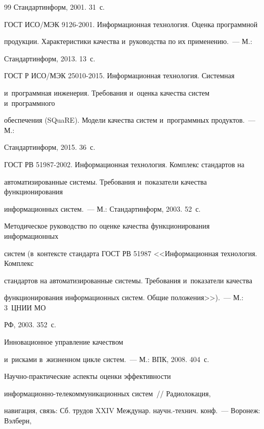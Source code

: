 {{\begin{thebibliography}{99}
Стандартинформ, 2001. 31~с.


  ГОСТ ИСО\!/\!МЭК 9126-2001. Информационная технология. Оценка программной 

продукции. Характеристики качества и~руководства по их применению.~--- М.: 

Стандартинформ, 2013. 13~с.


  ГОСТ Р ИСО\!/\!МЭК 25010-2015. Информационная технология. Системная 

и~программная инженерия. Требования и~оценка качества сис\-тем и~программного 

обеспечения (SQuaRE). Модели качества сис\-тем и~программных продуктов.~--- М.: 

Стандартинформ, 2015. 36~с. 


  ГОСТ РВ 51987-2002. Информационная технология. Комплекс стандартов на 

автоматизированные системы. Требования и~показатели качества функционирования 

информационных сис\-тем.~--- М.: Стандартинформ, 2003. 52~с. 


  Методическое руководство по оценке качества функционирования информационных 

систем (в~контексте стандарта ГОСТ РВ 51987 <<Информационная технология. Комплекс 

стандартов на автоматизированные сис\-те\-мы. Требования и~показатели качества 

функционирования информационных сис\-тем. Общие положения>>).~--- М.: 3~ЦНИИ МО 

РФ, 2003. 352~с.


   Инновационное управление качеством 

и~рисками в~жизненном цикле сис\-тем.~--- М.: ВПК, 2008. 404~с.


   Научно-практические аспекты оценки эффективности  

ин\-фор\-ма\-ци\-он\-но-те\-ле\-ком\-му\-ни\-ка\-ци\-он\-ных сис\-тем~/\!\!/ Радиолокация, 

навигация, связь: Сб. трудов XXIV Междунар. научн.-технич. конф.~---  Воронеж: Вэлберн, 


\end{thebibliography}}}

